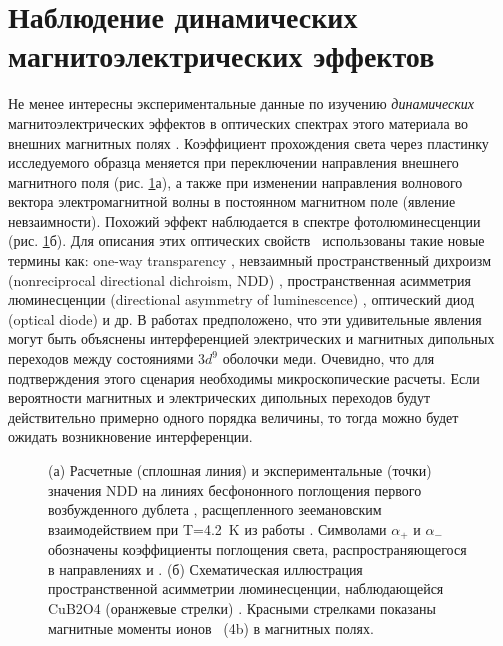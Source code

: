 \section{Наблюдение динамических магнитоэлектрических эффектов}\label{sec:ch1/sec2}

Не менее интересны экспериментальные данные по изучению \emph{динамических} магнитоэлектрических эффектов в оптических спектрах этого материала во внешних магнитных полях \cite{Saito2008prl, Saito2008jpsj, Lovesey2009, Toyoda2015, Boldyrev2015}. Коэффициент прохождения света через пластинку исследуемого образца меняется при переключении направления внешнего магнитного поля (рис. \cref{fig:ndd}а), а также при изменении направления волнового вектора электромагнитной волны в постоянном магнитном поле (явление невзаимности). Похожий эффект наблюдается в спектре фотолюминесценции (рис. \cref{fig:ndd}б). Для описания этих оптических свойств \cbo\ использованы такие новые термины как: one-way transparency \cite{Toyoda2015}, невзаимный пространственный дихроизм (nonreciprocal directional dichroism, NDD) \cite{Toyoda2015}, пространственная асимметрия люминесценции (directional asymmetry of luminescence) \cite{Toyoda2016}, оптический диод (optical diode) и др. В работах \cite{Toyoda2015, Toyoda2016} предположено, что эти удивительные явления могут быть объяснены интерференцией электрических и магнитных дипольных переходов между состояниями \(3d^9\) оболочки меди. Очевидно, что для подтверждения этого сценария необходимы микроскопические расчеты. Если вероятности магнитных и электрических дипольных переходов будут действительно примерно одного порядка величины, то тогда можно будет ожидать возникновение интерференции.


\begin{figure}[ht]
\label{fig:ndd}

	\caption{(а) Расчетные (сплошная линия) и экспериментальные (точки) значения NDD на линиях бесфононного поглощения первого возбужденного дублета \cbo, расщепленного зеемановским взаимодействием при T=\SI{4.2}{\kelvin} из работы \cite{Toyoda2015}. Символами \(\alpha_+\) и \(\alpha_-\) обозначены коэффициенты поглощения света, распространяющегося в направлениях  и . (б) Схематическая иллюстрация пространственной асимметрии люминесценции, наблюдающейся CuB2O4 (оранжевые стрелки) \cite{Toyoda2016}. Красными стрелками показаны магнитные моменты ионов \cu\ (4b) в магнитных полях.}
\end{figure}

